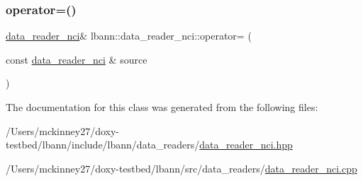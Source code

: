 \subsubsection{\texorpdfstring{operator=()}{operator=()}}
{\footnotesize\ttfamily \hyperlink{classlbann_1_1data__reader__nci}{data\+\_\+reader\+\_\+nci}\& lbann\+::data\+\_\+reader\+\_\+nci\+::operator= (\begin{DoxyParamCaption}\item[{const \hyperlink{classlbann_1_1data__reader__nci}{data\+\_\+reader\+\_\+nci} \&}]{source }\end{DoxyParamCaption})\hspace{0.3cm}{\ttfamily [default]}}



The documentation for this class was generated from the following files\+:\begin{DoxyCompactItemize}
\item 
/\+Users/mckinney27/doxy-\/testbed/lbann/include/lbann/data\+\_\+readers/\hyperlink{data__reader__nci_8hpp}{data\+\_\+reader\+\_\+nci.\+hpp}\item 
/\+Users/mckinney27/doxy-\/testbed/lbann/src/data\+\_\+readers/\hyperlink{data__reader__nci_8cpp}{data\+\_\+reader\+\_\+nci.\+cpp}\end{DoxyCompactItemize}
